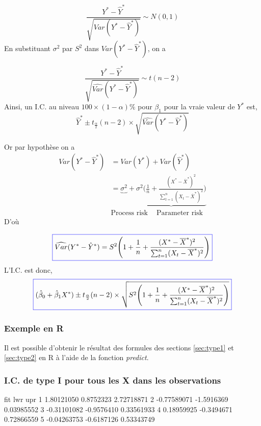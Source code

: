\documentclass[11pt,french]{report}
\begin{document}
$$
\frac{Y^* - \hat{Y}^*}{\sqrt{Var(Y^* - \hat{Y}^*)}} \sim N(0,1)
$$
En substituant $\sigma^2$ par $S^2$ dans $Var(Y^* - \hat{Y}^*)$, on a

$$
\frac{Y^* - \hat{Y}^*}{\sqrt{\widehat{Var}(Y^* - \hat{Y}^*)}} \sim t(n-2)
$$
Ainsi, un I.C. au niveau $100 \times (1 - \alpha)\%$ pour $\beta_1$  pour la vraie valeur de $Y^*$ est,
$$
\hat{Y}^* \pm t_{\frac{\alpha}{2}}(n-2)\times \sqrt{\widehat{Var}(Y^* - \hat{Y}^*)}
$$

Or par hypothèse on a
\begin{align*}
Var(Y^* - \hat{Y}^*) &= Var(Y^*) + Var(\hat{Y}^*) \\
&= \underbrace{\sigma^2} +\underbrace{\sigma^2\Bigg( \frac{1}{n} + \frac{(X^* - \overline{X}^*)^2}{\sum_{t=1}^n (X_t - \overline{X}^*)^2}\Bigg)}  \\
&   \text{Process risk }\ \ \ \  \text{Parameter risk}
\end{align*}
D'où 

\begin{equation}
\label{eq:var2*}
\color{blue}
\boxed{\color{black}
\widehat{Var}(Y^* - \hat{Y}^*) = S^2 \Bigg(1 + \frac{1}{n} + \frac{(X^* - \overline{X}^*)^2}{\sum_{t=1}^n (X_t - \overline{X}^*)^2}\Bigg)  
}
\end{equation}
L'I.C. est donc,
\begin{equation}
\label{eq:IC3}
\color{blue}
\boxed{\color{black}
(\hat{\beta}_0 + \hat{\beta}_1X^*) \pm t_{\frac{\alpha}{2}}(n-2)\times \sqrt{S^2 \Bigg(1 + \frac{1}{n} + \frac{(X^* - \overline{X}^*)^2}{\sum_{t=1}^n (X_t - \overline{X}^*)^2}\Bigg)}  
}
\end{equation}

\subsubsection*{Exemple en R}
Il est possible d'obtenir le résultat des formules des sections \ref{sec:type1} et \ref{sec:type2} en R à l'aide de la fonction \emph{predict}.

\subsubsection*{I.C. de type I pour tous les X dans les observations}
\begin{Schunk}
\begin{Soutput}
          fit        lwr        upr
1  1.80121050  0.8752323 2.72718871
2 -0.77589071 -1.5916369 0.03985552
3 -0.31101082 -0.9576410 0.33561933
4  0.18959925 -0.3494671 0.72866559
5 -0.04263753 -0.6187126 0.53343749
\end{Soutput}
\end{Schunk}
\end{document}
